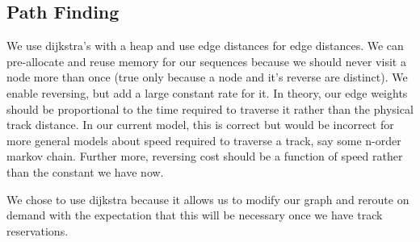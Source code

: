 \documentclass[letterpaper]{article}
\begin{document}
\subsection{Path Finding}

We use dijkstra's with a heap and use edge distances for edge distances. We can pre-allocate and reuse memory for our sequences because we should never visit a node more than once (true only because a node and it's reverse are distinct). We enable reversing, but add a large constant rate for it. In theory, our edge weights should be proportional to the time required to traverse it rather than the physical track distance. In our current model, this is correct but would be incorrect for more general models about speed required to traverse a track, say some n-order markov chain. Further more, reversing cost should be a function of speed rather than the constant we have now.

We chose to use dijkstra because it allows us to modify our graph and reroute on demand with the expectation that this will be necessary once we have track reservations.
\end{document}
